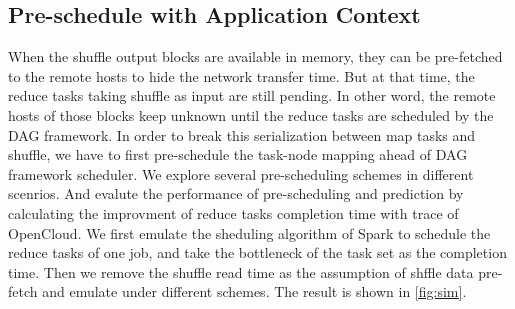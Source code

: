 \documentclass[10pt,twocolumn]{article}
\begin{document}
\subsection{Pre-schedule with Application Context}
When the shuffle output blocks are available in memory, they can be pre-fetched to the remote hosts to hide the network transfer time. But at that time, the reduce tasks taking shuffle as input are still pending. In other word, the remote hosts of those blocks keep unknown until the reduce tasks are scheduled by the DAG framework. In order to break this serialization between map tasks and shuffle, we have to first pre-schedule the task-node mapping ahead of DAG framework scheduler. We explore several pre-scheduling schemes in different scenrios. And evalute the performance of pre-scheduling and prediction by calculating the improvment of reduce tasks completion time with trace of OpenCloud\cite{opencloudtrace}. We first emulate the sheduling algorithm of Spark to schedule the reduce tasks of one job, and take the bottleneck of the task set as the completion time. Then we remove the shuffle read time as the assumption of shffle data pre-fetch and emulate under different schemes. The result is shown in \ref{fig:sim}.
\end{document}
